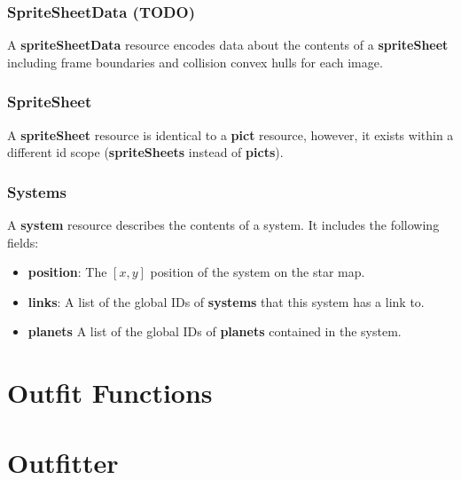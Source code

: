 \documentclass{article}
\begin{document}
\subsubsection{SpriteSheetData (TODO)}
A \textbf{spriteSheetData} resource encodes data about the contents of a \textbf{spriteSheet} including frame boundaries and collision convex hulls for each image.

\subsubsection{SpriteSheet}
A \textbf{spriteSheet} resource is identical to a \textbf{pict} resource, however, it exists within a different id scope (\textbf{spriteSheets} instead of \textbf{picts}).

\subsubsection{Systems}
A \textbf{system} resource describes the contents of a system. It includes the following fields:
\begin{itemize}
\item{\textbf{position}}: The $[x,y]$ position of the system on the star map.
\item{\textbf{links}}: A list of the global IDs of \textbf{systems} that this system has a link to.
\item{\textbf{planets}} A list of the global IDs of \textbf{planets} contained in the system.
\end{itemize}






  




\section{Outfit Functions} \label{outfit-functions}

\section{Outfitter} \label{outfitter}
\end{document}

